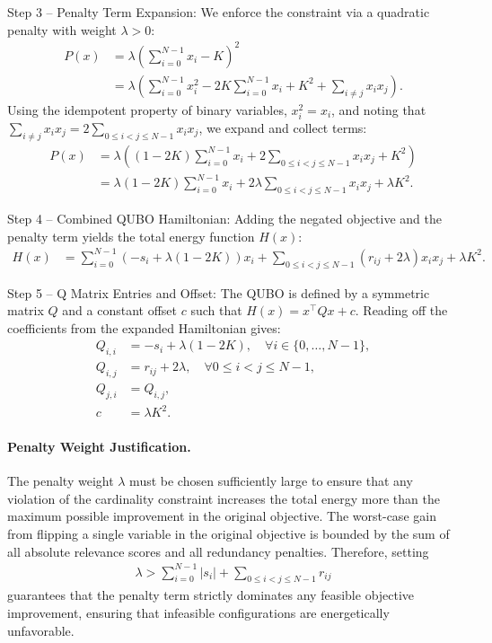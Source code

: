 \documentclass[12pt]{article}
\begin{document}
Step 3 -- Penalty Term Expansion:
We enforce the constraint via a quadratic penalty with weight $\lambda > 0$:
\begin{align}
    P(x) &= \lambda \left( \sum_{i=0}^{N-1} x_i - K \right)^2 \\
    &= \lambda \left( \sum_{i=0}^{N-1} x_i^2 - 2K \sum_{i=0}^{N-1} x_i + K^2 + \sum_{i \neq j} x_i x_j \right).
\end{align}
Using the idempotent property of binary variables, $x_i^2 = x_i$, and noting that $\sum_{i \neq j} x_i x_j = 2 \sum_{0 \le i < j \le N-1} x_i x_j$, we expand and collect terms:
\begin{align}
    P(x) &= \lambda \left( (1 - 2K) \sum_{i=0}^{N-1} x_i + 2 \sum_{0 \le i < j \le N-1} x_i x_j + K^2 \right) \\
    &= \lambda(1 - 2K) \sum_{i=0}^{N-1} x_i + 2\lambda \sum_{0 \le i < j \le N-1} x_i x_j + \lambda K^2.
\end{align}

Step 4 -- Combined QUBO Hamiltonian:
Adding the negated objective and the penalty term yields the total energy function $H(x)$:
\begin{align}
    H(x) &= \sum_{i=0}^{N-1} \left( -s_i + \lambda(1 - 2K) \right) x_i + \sum_{0 \le i < j \le N-1} \left( r_{ij} + 2\lambda \right) x_i x_j + \lambda K^2.
\end{align}

Step 5 -- Q Matrix Entries and Offset:
The QUBO is defined by a symmetric matrix $Q$ and a constant offset $c$ such that $H(x) = x^\top Q x + c$. Reading off the coefficients from the expanded Hamiltonian gives:
\begin{align}
    Q_{i,i} &= -s_i + \lambda(1 - 2K), \quad \forall i \in \{0, \dots, N-1\}, \\
    Q_{i,j} &= r_{ij} + 2\lambda, \quad \forall 0 \le i < j \le N-1, \\
    Q_{j,i} &= Q_{i,j}, \\
    c &= \lambda K^2.
\end{align}

\paragraph{Penalty Weight Justification.}
The penalty weight $\lambda$ must be chosen sufficiently large to ensure that any violation of the cardinality constraint increases the total energy more than the maximum possible improvement in the original objective. The worst-case gain from flipping a single variable in the original objective is bounded by the sum of all absolute relevance scores and all redundancy penalties. Therefore, setting
\begin{align}
    \lambda > \sum_{i=0}^{N-1} |s_i| + \sum_{0 \le i < j \le N-1} r_{ij}
\end{align}
guarantees that the penalty term strictly dominates any feasible objective improvement, ensuring that infeasible configurations are energetically unfavorable.
\end{document}
